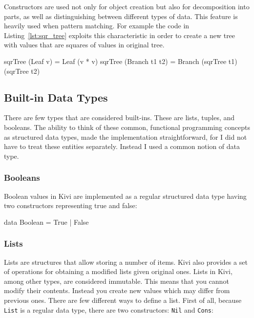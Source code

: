 \documentclass[12pt,a4paper]{report}
\begin{document}
Constructors are used not only for object creation but also for decomposition
into parts, as well as distinguishing between different types of data. This
feature is heavily used when pattern matching. For example the code in
Listing~\ref{lst:sqr_tree} exploits this characteristic in order to create a
new tree with values that are squares of values in original tree.

\vspace*{0.2in}
\begin{code}[style=haskell,label=lst:sqr_tree,caption={Creating a `square rooted` tree.}]
sqrTree (Leaf v) = Leaf (v * v)
sqrTree (Branch t1 t2) = Branch (sqrTree t1) (sqrTree t2)
\end{code}

\subsection{Built-in Data Types}
There are few types that are considered built-ins. These are lists, tuples,
and booleans. The ability to think of these common, functional programming
concepts as structured data types, made the implementation straightforward,
for I did not have to treat these entities separately. Instead I used a common
notion of data type.
\subsubsection{Booleans}
Boolean values in Kivi are implemented as a regular structured data type having
two constructors representing true and false:

\vspace*{0.2in}
\begin{code}[style=haskell]
data Boolean = True | False
\end{code}

\subsubsection{Lists}
Lists are structures that allow storing a number of items. Kivi also provides a
set of operations for obtaining a modified lists given original ones. Lists in
Kivi, among other types, are considered immutable. This means that you cannot
modify their contents. Instead you create new values which may differ from
previous ones. There are few different ways to define a list. First of all,
because \texttt{List} is a regular data type, there are two constructors:
\texttt{Nil} and \texttt{Cons}:
\end{document}
